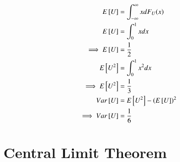 \documentclass[journal,12pt,twocolumn]{IEEEtran}
\begin{document}
\begin{align}
	E{}\left[U\right] &= \int_{-\infty}^{\infty}xdF_{U}(x)
	\\
	E{}\left[U\right] &= \int_{0}^{1}xdx
	\\
	\implies E{}\left[U\right] &= \frac{1}{2}
	\\
	E{}\left[U^2\right] &= \int_{0}^{1}x^2dx
	\\
	\implies E{}\left[U^2\right] &= \frac{1}{3}
	\\
	Var{}\left[U\right] &= E{}\left[U^2\right] - \left(E{}\left[U\right]\right)^2
	\\
	\implies Var{}\left[U\right] &= \frac{1}{6}
\end{align}

\section{Central Limit Theorem}
%
\end{document}
